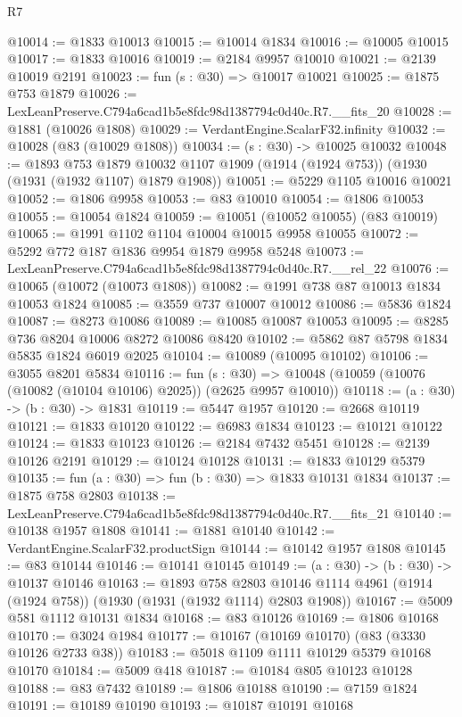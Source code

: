 \begin{lexlean}{R7}
\begin{coremodule}
@10014 := @1833 @10013
@10015 := @10014 @1834
@10016 := @10005 @10015
@10017 := @1833 @10016
@10019 := @2184 @9957 @10010
@10021 := @2139 @10019 @2191
@10023 := fun (s : @30) => @10017 @10021
@10025 := @1875 @753 @1879
@10026 := LexLeanPreserve.C794a6cad1b5e8fdc98d1387794c0d40c.R7.__fits_20
@10028 := @1881 (@10026 @1808)
@10029 := VerdantEngine.ScalarF32.infinity
@10032 := @10028 (@83 (@10029 @1808))
@10034 := (s : @30) -> @10025 @10032
@10048 := @1893
    @753
    @1879
    @10032
    @1107
    @1909
    (@1914 (@1924 @753))
    (@1930 (@1931 (@1932 @1107) @1879 @1908))
@10051 := @5229 @1105 @10016 @10021
@10052 := @1806 @9958
@10053 := @83 @10010
@10054 := @1806 @10053
@10055 := @10054 @1824
@10059 := @10051 (@10052 @10055) (@83 @10019)
@10065 := @1991 @1102 @1104 @10004 @10015 @9958 @10055
@10072 := @5292 @772 @187 @1836 @9954 @1879 @9958 @5248
@10073 := LexLeanPreserve.C794a6cad1b5e8fdc98d1387794c0d40c.R7.__rel_22
@10076 := @10065 (@10072 (@10073 @1808))
@10082 := @1991 @738 @87 @10013 @1834 @10053 @1824
@10085 := @3559 @737 @10007 @10012
@10086 := @5836 @1824
@10087 := @8273 @10086
@10089 := @10085 @10087 @10053
@10095 := @8285 @736 @8204 @10006 @8272 @10086 @8420
@10102 := @5862 @87 @5798 @1834 @5835 @1824 @6019 @2025
@10104 := @10089 (@10095 @10102)
@10106 := @3055 @8201 @5834
@10116 := fun (s : @30) =>
  @10048 (@10059 (@10076 (@10082 (@10104 @10106) @2025)) (@2625 @9957 @10010))
@10118 := (a : @30) -> (b : @30) -> @1831
@10119 := @5447 @1957
@10120 := @2668 @10119
@10121 := @1833 @10120
@10122 := @6983 @1834
@10123 := @10121 @10122
@10124 := @1833 @10123
@10126 := @2184 @7432 @5451
@10128 := @2139 @10126 @2191
@10129 := @10124 @10128
@10131 := @1833 @10129 @5379
@10135 := fun (a : @30) => fun (b : @30) => @1833 @10131 @1834
@10137 := @1875 @758 @2803
@10138 := LexLeanPreserve.C794a6cad1b5e8fdc98d1387794c0d40c.R7.__fits_21
@10140 := @10138 @1957 @1808
@10141 := @1881 @10140
@10142 := VerdantEngine.ScalarF32.productSign
@10144 := @10142 @1957 @1808
@10145 := @83 @10144
@10146 := @10141 @10145
@10149 := (a : @30) -> (b : @30) -> @10137 @10146
@10163 := @1893
    @758
    @2803
    @10146
    @1114
    @4961
    (@1914 (@1924 @758))
    (@1930 (@1931 (@1932 @1114) @2803 @1908))
@10167 := @5009 @581 @1112 @10131 @1834
@10168 := @83 @10126
@10169 := @1806 @10168
@10170 := @3024 @1984
@10177 := @10167 (@10169 @10170) (@83 (@3330 @10126 @2733 @38))
@10183 := @5018 @1109 @1111 @10129 @5379 @10168 @10170
@10184 := @5009 @418
@10187 := @10184 @805 @10123 @10128
@10188 := @83 @7432
@10189 := @1806 @10188
@10190 := @7159 @1824
@10191 := @10189 @10190
@10193 := @10187 @10191 @10168

\end{coremodule}
\end{lexlean}
